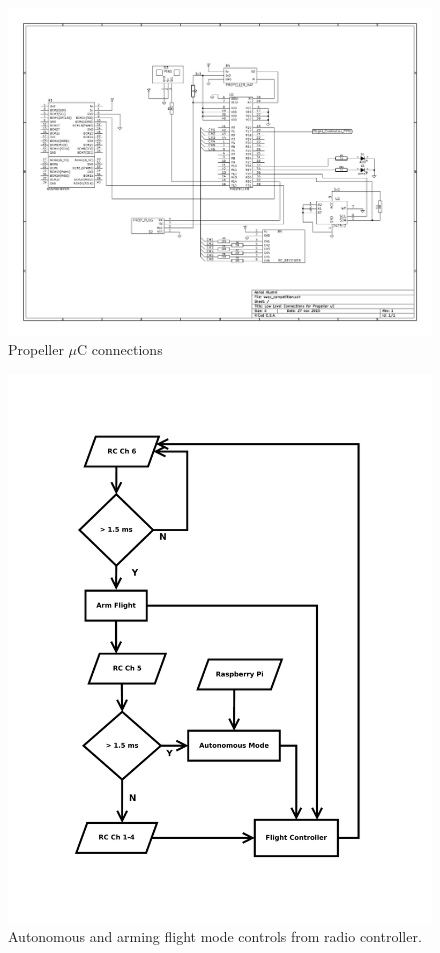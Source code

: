 \documentclass{article}
\begin{document}
\begin{figure}[h]
\caption{Propeller $\mu$C connections}
\includegraphics[height=\textwidth, angle=90]{vwcc_competition.pdf}
\end{figure}

\begin{figure}[h]
\caption{Autonomous and arming flight mode controls from radio controller.}
\includegraphics[width=\textwidth,]{Arm_auto.pdf}
\end{figure}
\end{document}
